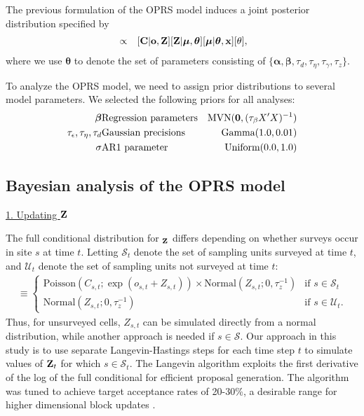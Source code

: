 \documentclass[12pt,fleqn]{article}
\begin{document}
\begin{flushleft}
\hspace{.5in}  The previous formulation of the OPRS model induces a joint posterior distribution specified by
\begin{eqnarray}
  [{\bf Z},\boldsymbol{\mu},\boldsymbol{\theta}| {\bf x},{\bf C},{\bf o}] & \propto & [{\bf C} | {\bf o}, {\bf Z}][{\bf Z} | \boldsymbol{\mu},\boldsymbol{\theta}] [\boldsymbol{\mu} | \boldsymbol{\theta},{\bf x}] [\theta],
  \label{eq:hmod}
\end{eqnarray}
where we use $\boldsymbol{\theta}$ to denote the set of parameters consisting of $ \{ \boldsymbol{\alpha},\boldsymbol{\beta},\tau_d,\tau_\eta,\tau_\gamma,\tau_z \}$.

\hspace{.5in}To analyze the OPRS model, we need to assign prior distributions to several model parameters.  We selected the following priors for all analyses:
\begin{eqnarray*}
  \boldsymbol{\beta} & \textrm{Regression parameters} & {\rm MVN}({\bf 0},(\tau_\beta X^\prime X)^{-1}) \\
  \tau_\epsilon, \tau_\eta, \tau_d  & \textrm{Gaussian precisions} & \textrm{Gamma}(1.0,0.01) \\
  \sigma & \textrm{AR1 parameter} & \textrm{Uniform}(0.0,1.0)
   \label{eq:priors}
\end{eqnarray*}



\subsection{Bayesian analysis of the OPRS model}


\underline{1. Updating ${\bf Z}$}

The full conditional distribution for ${\bf_Z}$ differs depending on whether surveys occur in site $s$ at time $t$. Letting $\mathcal{S}_t$ denote the set of sampling units surveyed at time $t$, and $\mathcal{U}_t$ denote the set of sampling units not surveyed at time $t$:
\begin{eqnarray*}
  [{\bf Z}|\cdot] \equiv \begin{cases}
                   \textrm{Poisson}(C_{s,t};\exp(o_{s,t} + Z_{s,t})) \times \textrm{Normal}(Z_{s,t}; 0,\tau_z^{-1}) & \textrm{if } s \in \mathcal{S}_t \\
                     \textrm{Normal}(Z_{s,t}; 0,\tau_z^{-1}) & \textrm{if } s \in \mathcal{U}_t.
                  \end{cases}
\end{eqnarray*}
Thus, for unsurveyed cells, $Z_{s,t}$ can be simulated directly from a normal distribution, while another approach
is needed if $s \in \mathcal{S}$.  Our approach in this study is to use separate Langevin-Hastings steps \citep[see e.g.][section 7.1.4]{GivensHoeting2005} for each
time step $t$ to simulate values of ${\bf Z}_t$ for which $s \in \mathcal{S}_t$.  The Langevin algorithm exploits the first derivative of the log of the full conditional for efficient proposal generation.  The algorithm was tuned to achieve target acceptance rates of 20-30\%, a desirable range for higher dimensional block updates \citep{GelmanEtAl2004}.


\end{flushleft}
\end{document}
